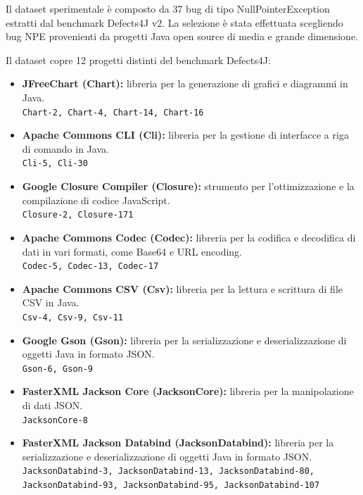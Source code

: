 Il dataset sperimentale è composto da 37 bug di tipo NullPointerException estratti dal 
benchmark Defects4J v2. La selezione è stata effettuata scegliendo bug NPE provenienti 
da progetti Java open source di media e grande dimensione.

Il dataset copre 12 progetti distinti del benchmark Defects4J:

\begin{itemize}
    \item \textbf{JFreeChart (Chart):} libreria per la generazione di grafici e diagrammi 
    in Java.\\
    \texttt{Chart-2, Chart-4, Chart-14, Chart-16}
    
    \item \textbf{Apache Commons CLI (Cli):} libreria per la gestione di interfacce a riga 
    di comando in Java.\\
    \texttt{Cli-5, Cli-30}
    
    \item \textbf{Google Closure Compiler (Closure):} strumento per l'ottimizzazione e la 
    compilazione di codice JavaScript.\\
    \texttt{Closure-2, Closure-171}
    
    \item \textbf{Apache Commons Codec (Codec):} libreria per la codifica e decodifica di 
    dati in vari formati, come Base64 e URL encoding.\\
    \texttt{Codec-5, Codec-13, Codec-17}
    
    \item \textbf{Apache Commons CSV (Csv):} libreria per la lettura e scrittura di file CSV 
    in Java.\\
    \texttt{Csv-4, Csv-9, Csv-11}
    
    \item \textbf{Google Gson (Gson):} libreria per la serializzazione e deserializzazione di 
    oggetti Java in formato JSON.\\
    \texttt{Gson-6, Gson-9}
    
    \item \textbf{FasterXML Jackson Core (JacksonCore):} libreria per la manipolazione di 
    dati JSON.\\
    \texttt{JacksonCore-8}
    
    \item \textbf{FasterXML Jackson Databind (JacksonDatabind):} libreria per la 
    serializzazione e deserializzazione di oggetti Java in formato JSON.\\
    \texttt{JacksonDatabind-3, JacksonDatabind-13, JacksonDatabind-80,}\\
    \texttt{JacksonDatabind-93, JacksonDatabind-95, JacksonDatabind-107}
    

\end{itemize}
